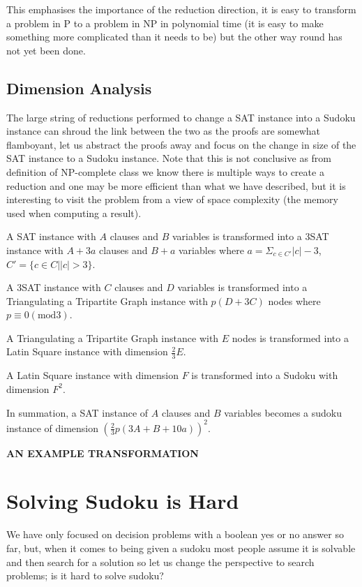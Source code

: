 \documentclass[a4paper,11pt]{report}
\begin{document}
This emphasises the importance of the reduction direction, it is easy to transform a problem in P to a problem in NP in polynomial time (it is easy to make something more complicated than it needs to be) but the other way round has not yet been done. 

\subsection{Dimension Analysis}

The large string of reductions performed to change a SAT instance into a Sudoku instance can shroud the link between the two as the proofs are somewhat flamboyant, let us abstract the proofs away and focus on the change in size of the SAT instance to a Sudoku instance. Note that this is not conclusive as from definition of NP-complete class we know there is multiple ways to create a reduction and one may be more efficient than what we have described, but it is interesting to visit the problem from a view of space complexity (the memory used when computing a result).

A SAT instance with $A$ clauses and $B$ variables is transformed into a 3SAT instance with $A + 3a$ clauses and $B+a$ variables where $a=\Sigma_{c\in C'}|c|-3$, $C'=\{c\in C | |c|>3\}$. 

A 3SAT instance with $C$ clauses and $D$ variables is transformed into a Triangulating a Tripartite Graph instance with $p(D+3C)$ nodes where $p\equiv 0 (\text{mod}3)$.

A Triangulating a Tripartite Graph instance with $E$ nodes is transformed into a Latin Square instance with dimension $\frac{2}{3}E$.

A Latin Square instance with dimension $F$ is transformed into a Sudoku with dimension $F^2$.

In summation, a SAT instance of $A$ clauses and $B$ variables becomes a sudoku instance of dimension $(\frac{2}{3}p(3A+B+10a))^2 $.

\textbf{AN EXAMPLE TRANSFORMATION}

\section{Solving Sudoku is Hard}

We have only focused on decision problems with a boolean yes or no answer so far, but, when it comes to being given a sudoku most people assume it is solvable and then search for a solution so let us change the perspective to search problems; is it hard to solve sudoku? 
\end{document}
